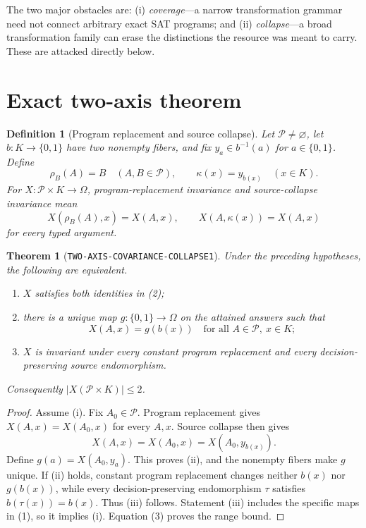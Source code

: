\documentclass[11pt]{article}
\newtheorem{theorem}{Theorem}
\newtheorem{definition}{Definition}
\begin{document}
The two major obstacles are: (i) \emph{coverage}---a narrow transformation
grammar need not connect arbitrary exact SAT programs; and (ii)
\emph{collapse}---a broad transformation family can erase the distinctions
the resource was meant to carry.  These are attacked directly below.

\section{Exact two-axis theorem}

\begin{definition}[Program replacement and source collapse]
Let $\mathcal P\ne\varnothing$, let $b:K\to\{0,1\}$ have two nonempty
fibers, and fix $y_a\in b^{-1}(a)$ for $a\in\{0,1\}$.  Define
\[
 \rho_B(A)=B\quad(A,B\in\mathcal P),
 \qquad
 \kappa(x)=y_{b(x)}\quad(x\in K).                         \tag{1}
\]
For $X:\mathcal P\times K\to\Omega$, program-replacement invariance and
source-collapse invariance mean
\[
 X(\rho_B(A),x)=X(A,x),
 \qquad
 X(A,\kappa(x))=X(A,x)                                   \tag{2}
\]
for every typed argument.
\end{definition}

\begin{theorem}[\texttt{TWO-AXIS-COVARIANCE-COLLAPSE1}]
Under the preceding hypotheses, the following are equivalent.
\begin{enumerate}[label=(\roman*),leftmargin=1.7em]
\item $X$ satisfies both identities in (2);
\item there is a unique map $g:\{0,1\}\to\Omega$ on the attained answers
such that
\[
                 X(A,x)=g(b(x))
                 \quad\text{for all }A\in\mathcal P,\ x\in K;              \tag{3}
\]
\item $X$ is invariant under every constant program replacement and every
decision-preserving source endomorphism.
\end{enumerate}
Consequently $|X(\mathcal P\times K)|\le2$.
\end{theorem}

\begin{proof}
Assume (i).  Fix $A_0\in\mathcal P$.  Program replacement gives
$X(A,x)=X(A_0,x)$ for every $A,x$.  Source collapse then gives
\[
 X(A,x)=X(A_0,x)=X(A_0,y_{b(x)}).
\]
Define $g(a)=X(A_0,y_a)$.  This proves (ii), and the nonempty fibers make $g$
unique.  If (ii) holds, constant program replacement changes neither $b(x)$
nor $g(b(x))$, while every decision-preserving endomorphism $\tau$ satisfies
$b(\tau(x))=b(x)$.  Thus (iii) follows.  Statement (iii) includes the
specific maps in (1), so it implies (i).  Equation (3) proves the range bound.
\end{proof}
\end{document}
